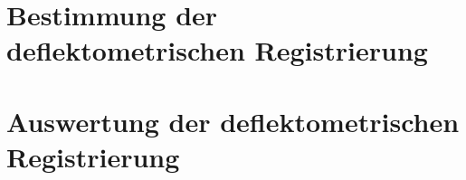 {
	\FloatBarrier
    \section{Bestimmung der deflektometrischen Registrierung}
    \label{sec:bestimmungDeflektometrischeRegistrierung}
    
}

{
	\FloatBarrier
    \section{Auswertung der deflektometrischen Registrierung}
    \label{sec:auswertungDeflektometrischeRegistrierung}
    
}